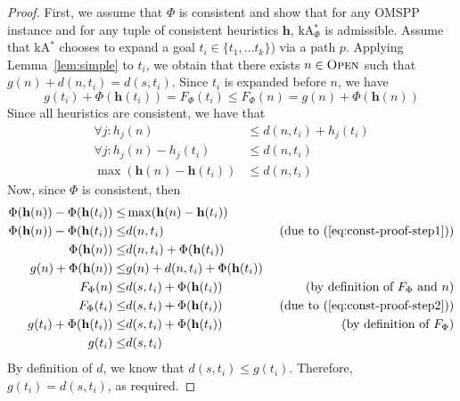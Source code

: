\documentclass[smallextended]{svjour3}       %
\newcommand{\omspp}{\ac{OMSPP}\xspace}
\newcommand{\kastar}{kA$^*$\xspace}
\newcommand{\kastarphi}{\textup{kA}$^*_{\Phi}$\xspace}
\newcommand{\open}{\textsc{Open}\xspace}
\newcommand{\axiomcons}{consistent\xspace}
\newcommand{\vect}[1]{\mathbf{#1}}
\begin{document}
\consistency*
\begin{proof}
  First, we assume that $\Phi$ is \axiomcons and show that for any \omspp instance and for any tuple of consistent heuristics $\vect{h}$, \kastarphi is admissible.
  Assume that \kastar chooses to expand a goal $t_i \in \{t_1, \ldots t_k\}$) via a path $p$. 
  Applying Lemma~\ref{lem:simple} to $t_i$, we obtain that there exists $n\in \open$ such that $g(n) + d(n, t_i) = d(s, t_i)$.
  Since $t_i$ is expanded before $n$, we have 
  \begin{equation}
      g(t_i) + \Phi(\vect{h}(t_i)) = F_\Phi(t_i) \leq F_\Phi(n) = g(n) + \Phi(\vect{h}(n))
      \label{eq:const-proof-step2}
  \end{equation}
    Since all heuristics are consistent, we have that
  \begin{align}
  \forall j: h_j(n)                  & \leq d(n, t_i) + h_j(t_i)   \\
  \forall j:  h_j(n) - h_j(t_i)       & \leq d(n, t_i) \\
  \max(\vect{h}(n) - \vect{h}(t_i)) &\leq d(n, t_i)
    \label{eq:const-proof-step1}
\end{align}
Now, since $\Phi$ is \axiomcons, then 
\begin{align}
    \Phi(\vect{h}(n))-\Phi(\vect{h}(t_i))\leq & \max(\vect{h}(n)-\vect{h}(t_i)) & \\
    \Phi(\vect{h}(n))-\Phi(\vect{h}(t_i))  \leq & d(n, t_i)  & \text{ (due to (\ref{eq:const-proof-step1}))}\\
        \Phi(\vect{h}(n))  \leq &d(n, t_i) + \Phi(\vect{h}(t_i)) & \\
    g(n) + \Phi(\vect{h}(n))           \leq & g(n)+ d(n, t_i) + \Phi(\vect{h}(t_i)) & \\
    F_\Phi(n)           \leq & d(s, t_i) + \Phi(\vect{h}(t_i)) &
    \text{(by definition of $F_\Phi$ and $n$)}\\
    F_\Phi(t_i)           \leq & d(s, t_i) + \Phi(\vect{h}(t_i)) &
    \text{(due to (\ref{eq:const-proof-step2}))}\\
    g(t_i) + \Phi(\vect{h}(t_i))           \leq & d(s, t_i) + \Phi(\vect{h}(t_i)) & \text{(by definition of $F_\Phi$)}\\
    g(t_i)                \leq & d(s, t_i) & 
  \end{align}  
  By definition of $d$, we know that $d(s,t_i)\leq g(t_i)$.
  Therefore, $g(t_i)=d(s,t_i)$, as required.


\end{proof}
\end{document}
